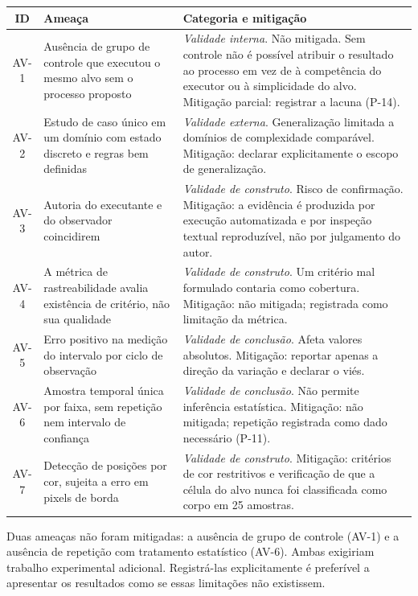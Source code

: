 \begin{quadro}[htb]
	\caption{Ameaças à validade identificadas e mitigações}
	\label{qua:ameacas}
	\centering
	\footnotesize
	\begin{tabularx}{\textwidth}{@{}c p{4.6cm} X@{}}
		\toprule
		\textbf{ID} & \textbf{Ameaça} & \textbf{Categoria e mitigação} \\
		\midrule
		AV-1 & Ausência de grupo de controle que executou o mesmo alvo sem o processo proposto & \textit{Validade interna}. Não mitigada. Sem controle não é possível atribuir o resultado ao processo em vez de à competência do executor ou à simplicidade do alvo. Mitigação parcial: registrar a lacuna (P-14). \\
		\addlinespace
		AV-2 & Estudo de caso único em um domínio com estado discreto e regras bem definidas & \textit{Validade externa}. Generalização limitada a domínios de complexidade comparável. Mitigação: declarar explicitamente o escopo de generalização. \\
		\addlinespace
		AV-3 & Autoria do executante e do observador coincidirem & \textit{Validade de construto}. Risco de confirmação. Mitigação: a evidência é produzida por execução automatizada e por inspeção textual reproduzível, não por julgamento do autor. \\
		\addlinespace
		AV-4 & A métrica de rastreabilidade avalia existência de critério, não sua qualidade & \textit{Validade de construto}. Um critério mal formulado contaria como cobertura. Mitigação: não mitigada; registrada como limitação da métrica. \\
		\addlinespace
		AV-5 & Erro positivo na medição do intervalo por ciclo de observação & \textit{Validade de conclusão}. Afeta valores absolutos. Mitigação: reportar apenas a direção da variação e declarar o viés. \\
		\addlinespace
		AV-6 & Amostra temporal única por faixa, sem repetição nem intervalo de confiança & \textit{Validade de conclusão}. Não permite inferência estatística. Mitigação: não mitigada; repetição registrada como dado necessário (P-11). \\
		\addlinespace
		AV-7 & Detecção de posições por cor, sujeita a erro em pixels de borda & \textit{Validade de construto}. Mitigação: critérios de cor restritivos e verificação de que a célula do alvo nunca foi classificada como corpo em 25 amostras. \\
		\bottomrule
	\end{tabularx}
\end{quadro}

Duas ameaças não foram mitigadas: a ausência de grupo de controle (AV-1) e a
ausência de repetição com tratamento estatístico (AV-6). Ambas exigiriam trabalho
experimental adicional. Registrá-las explicitamente é preferível a apresentar os
resultados como se essas limitações não existissem.
